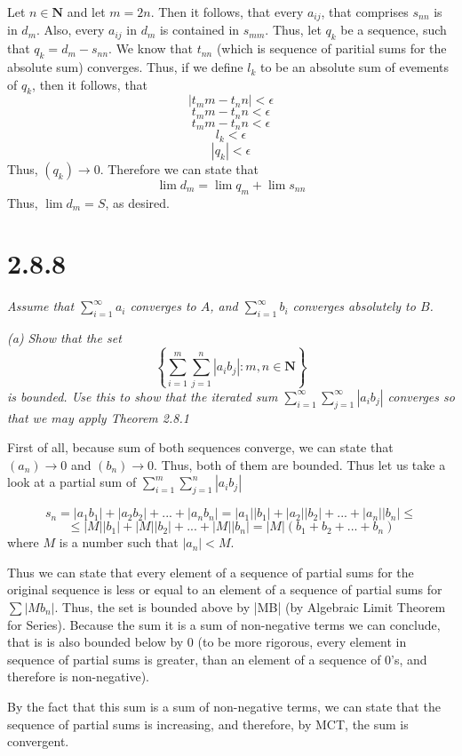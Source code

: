 \documentclass[11pt,oneside,titlepage]{article}
\begin{document}
Let $n \in \textbf{N}$ and let $m = 2n$. Then it follows, that
every $a_{ij}$, that comprises $s_{nn}$ is in $d_{m}$. Also, every $a_{ij}$
in $d_{m}$ is contained in $s_{mm}$. Thus, let $q_k$ be a sequence, such that
$q_k = d_m - s_{nn}$. We know that $t_{nn}$ (which is sequence of  paritial
sums for the absolute sum) converges. Thus, if we define $l_k$ to be an
absolute sum of evements of $q_k$, then it follows, that 
$$ |t_mm - t_nn| < \epsilon $$
$$ t_mm - t_nn < \epsilon $$
$$ t_mm - t_nn < \epsilon $$
$$  l_k < \epsilon $$
$$|q_k| < \epsilon$$
Thus, $(q_k) \to 0$. Therefore we can state that
$$\lim d_m = \lim q_m + \lim s_{nn}$$
Thus, $\lim d_m = S$, as desired.

\section*{2.8.8}
\textit{Assume that $\sum_{i = 1}^{\infty} a_i$  converges to $A$, and
  $\sum_{i = 1}^{\infty} b_i$ converges absolutely to $B$.}

\textit{(a) Show that the set}
$$\left\{\sum_{i = 1}^{m}\sum_{j = 1}^{n}|a_i b_j|: m,n \in \textbf{N}\right\}$$
\textit{is bounded. Use this to show that the iterated sum
  $\sum_{i = 1}^{\infty}\sum_{j = 1}^{\infty}|a_i b_j|$ converges so that we
  may apply Theorem 2.8.1}


First of all, because sum of both sequences converge, we can state that
$(a_n) \to 0$ and $(b_n) \to 0$. Thus, both of them are bounded. Thus
let us take a look at a partial sum of $\sum_{i = 1}^{m}\sum_{j = 1}^{n}|a_i b_j|$

$$s_n = |a_1 b_1| + |a_2 b_2| + ... + |a_n b_n| =
|a_1||b_1| + |a_2 || b_2| + ... + |a_n ||b_n| \leq$$
$$\leq |M||b_1| + |M||b_2| + ... + |M||b_n| = |M|(b_1 + b_2 + ... + b_n)$$
where $M$ is a number such that $|a_n| < M$.

Thus we can state that every element of a sequence of partial sums for the
original sequence is less or equal to an element of a sequence of partial sums
for $\sum |Mb_n|$. Thus, the set is bounded above by |MB| (by Algebraic Limit
Theorem for Series). Because the sum it is a sum of non-negative terms we
can conclude, that is is also bounded below by 0 (to be more rigorous, every
element in sequence of partial sums is greater, than an element of a sequence
of 0's, and therefore is non-negative).

By the fact that this sum is a sum of non-negative terms, we can state that
the sequence of partial sums is increasing, and therefore, by MCT, the sum
is convergent.
\end{document}
